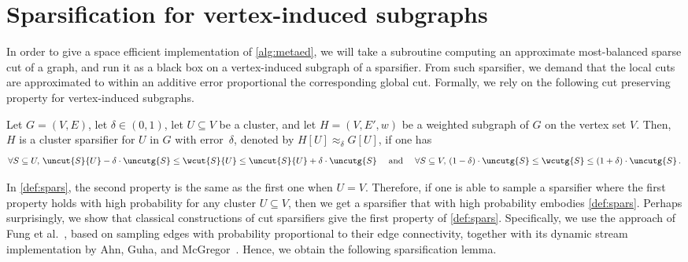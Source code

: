 \section{Sparsification for vertex-induced subgraphs}
\label{sec:spars}
In order to give a space efficient implementation of \cref{alg:metaed}, we will take a subroutine computing an approximate most-balanced sparse cut of a graph, and run it as a black box on a vertex-induced subgraph of a sparsifier. From such sparsifier, we demand that the local cuts are approximated to within an additive error proportional the corresponding global cut. Formally, we rely on the following cut preserving property for vertex-induced subgraphs.
\begin{definition}
	\label{def:spars}
	Let $G=(V,E)$, let $\delta \in (0,1)$, let $U \subseteq V$ be a cluster, and let $H=(V,E',w)$ be a weighted subgraph of $G$ on the vertex set $V$. Then, $H$ is a cluster sparsifier for $U$ in $G$ with error~$\delta$, denoted by $H[U] \approx_\delta G[U]$, if one has
	\begin{equation*}
		\forall S \subseteq U,\,\uncut{S}{U} - \delta \cdot \uncutg{S} \le \wcut{S}{U}  \le \uncut{S}{U} + \delta \cdot \uncutg{S} \quad \text{ and }  \quad \forall S \subseteq V,\, (1-\delta)\cdot \uncutg{S}\le \wcutg{S} \le (1+\delta)\cdot \uncutg{S}\, .
	\end{equation*}
\end{definition}
\noindent
In \cref{def:spars}, the second property is the same as the first one when $U=V$. Therefore, if one is able to sample a sparsifier where the first property holds with high probability for any cluster $U\subseteq V$, then we get a sparsifier that with high probability embodies \cref{def:spars}. Perhaps surprisingly, we show that classical constructions of cut sparsifiers give the first property of \cref{def:spars}. Specifically, we use the approach of Fung et al.~\cite{fungspars}, based on sampling edges with probability proportional to their edge connectivity, together with its dynamic stream implementation by Ahn, Guha, and McGregor~\cite{sparsdynamicstreams}. Hence, we obtain the following sparsification lemma.

